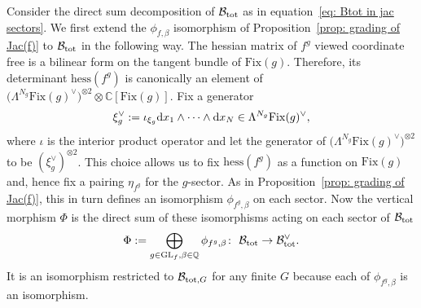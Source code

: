 \documentclass[10pt,a4paper]{amsart}
\numberwithin{equation}{section}
\newcommand{\QQ}{{\mathbb{Q}}}
\newcommand{\GL}{{\mathrm{GL}}}
\newcommand{\Fix}{\mathrm{Fix}}
\newcommand{\hess}{\mathrm{hess}}
\def\B{{\mathcal B}}
\newcommand\iot{\iota}
\begin{document}
Consider the direct sum decomposition of $\B_{\rm tot}$ as in equation~\eqref{eq: Btot in jac sectors}. We first extend the $\phi_{f,\beta}$ isomorphism of Proposition~\ref{prop: grading of Jac(f)} to $\B_{\rm tot}$ in the following way. The hessian matrix of $f^g$ viewed coordinate free is a bilinear form on the tangent bundle of $\Fix(g)$. Therefore, its determinant $\hess(f^g)$ is canonically an element of $\bigl(\Lambda^{N_g} \Fix(g)^\vee\bigr)^{\otimes 2}\otimes \mathbb{C}[\Fix(g)]$. Fix a generator \[\xi^\vee_g:=\iot_{\xi_g}{\rm d}x_1\wedge\cdots\wedge {\rm d}x_N\in\Lambda^{N_g} \Fix(g)^\vee,\] where $\iot$ is the interior product operator and let the generator of $\bigl(\Lambda^{N_g}\Fix(g)^\vee\bigr)^{\otimes 2}$ to be $(\xi^\vee_g)^{\otimes 2}$. This choice allows us to fix $\hess(f^g)$ as a function on $\Fix(g)$ and, hence fix a pairing $\eta_{f^g}$ for the $g$-sector. As in Proposition~\ref{prop: grading of Jac(f)}, this in turn defines an isomorphism $\phi_{f^g,\beta}$ on each sector.
Now the vertical morphism $\Phi$ is the direct sum of these isomorphisms acting on each sector of $\B_{\rm tot}$
\[
	\Phi := \bigoplus_{g \in \GL_f,\beta\in\QQ} \phi_{f^g,\beta} \colon \ \B_{\rm tot}\to \B_{\rm tot}^\vee.
\]
It is an isomorphism restricted to $\B_{{\rm tot},G}$ for any finite $G$ because each of $\phi_{f^g,\beta}$ is an isomorphism.
\end{document}
